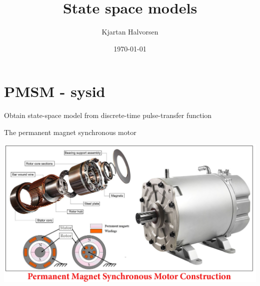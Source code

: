 \documentclass[presentation,aspectratio=1610]{beamer}
\author{Kjartan Halvorsen}
\date{\today}
\title{State space models}
\begin{document}
\maketitle



\section{PMSM - sysid}
\label{sec:orgd8d4281}

\begin{frame}[label={sec:org9a749ce}]{Obtain state-space model from discrete-time pulse-transfer function}
\end{frame}

\begin{frame}[label={sec:org7a551b6}]{The permanent magnet synchronous motor}
\begin{center}
\includegraphics[width=0.9\linewidth]{../../figures/permanent-motor.jpg}
\end{center}
\end{frame}
\end{document}
